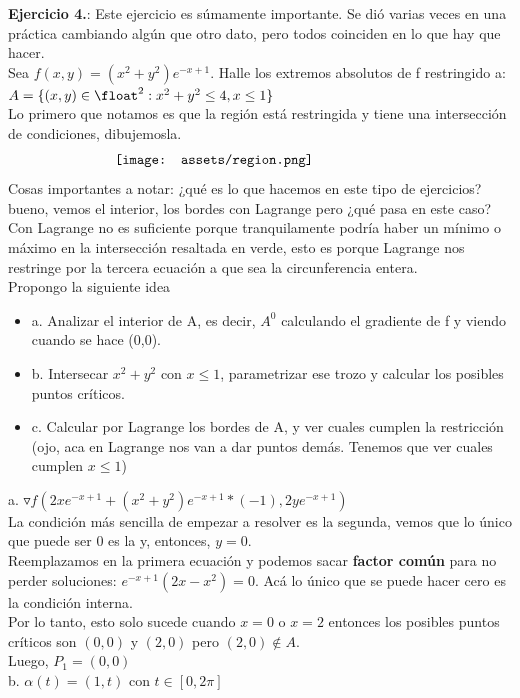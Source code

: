 \documentclass[10pt,a4paper]{article}
\begin{document}
\textbf{Ejercicio 4.}: Este ejercicio es súmamente importante. Se dió varias veces en una práctica cambiando algún que otro dato, pero todos coinciden en lo que hay que hacer. \\
Sea $f(x,y) = (x^{2} + y^{2}) e^{-x+1}$. Halle los extremos absolutos de f restringido a: $A = \{(x,y) \in \float^{2}: x^{2} + y^{2} \le 4, x \le 1\}$ \\
Lo primero que notamos es que la región está restringida y tiene una intersección de condiciones, dibujemosla. 
\[\begin{minipage}[b]{0.6\textwidth}
    \texttt{[image: assets/region.png]}
\end{minipage}\]
Cosas importantes a notar: ¿qué es lo que hacemos en este tipo de ejercicios? bueno, vemos el interior, los bordes con Lagrange pero ¿qué pasa en este caso? Con Lagrange no es suficiente porque tranquilamente podría haber un mínimo o máximo en la intersección resaltada en verde, esto es porque Lagrange nos restringe por la tercera ecuación a que sea la circunferencia entera. \\
Propongo la siguiente idea 
\begin{itemize}
    \item a. Analizar el interior de A, es decir, $A^{0}$ calculando el gradiente de f y viendo cuando se hace (0,0).
    \item b. Intersecar $x^{2} + y^{2}$ con $x \le 1$, parametrizar ese trozo y calcular los posibles puntos críticos. 
    \item c. Calcular por Lagrange los bordes de A, y ver cuales cumplen la restricción (ojo, aca en Lagrange nos van a dar puntos demás. Tenemos que ver cuales cumplen $x \le 1 $)
\end{itemize}
a. $\triangledown f (2xe^{-x+1}+(x^{2} + y^{2})e^{-x+1}*(-1), 2ye^{-x+1})$ \\
La condición más sencilla de empezar a resolver es la segunda, vemos que lo único que puede ser 0 es la y, entonces, $y = 0$. \\
Reemplazamos en la primera ecuación y podemos sacar \textbf{factor común} para no perder soluciones: $e^{-x+1}(2x-x^{2}) = 0$. Acá lo único que se puede hacer cero es la condición interna. \\
Por lo tanto, esto solo sucede cuando $x=0$ o $x=2$ entonces los posibles puntos críticos son $(0,0)$ y $(2,0)$ pero $(2,0) \notin A$. \\
Luego, $P_{1} = (0,0)$ \\
b. $\alpha(t) = (1,t)$ con $ t \in [0, 2\pi]$ \\
\end{document}
